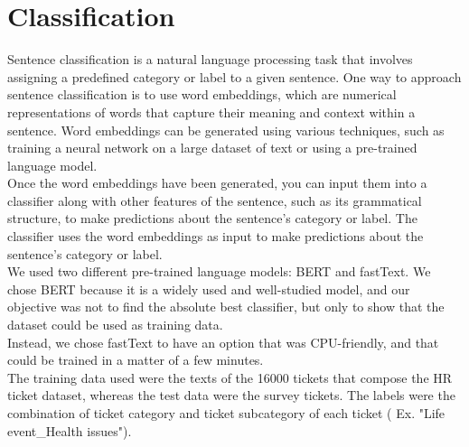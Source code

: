 \clearpage
\section{Classification}
\label{sec:classification}
Sentence classification is a natural language processing task that involves assigning a predefined category or label to a given sentence. One way to approach sentence classification is to use word embeddings, which are numerical representations of words that capture their meaning and context within a sentence. Word embeddings can be generated using various techniques, such as training a neural network on a large dataset of text or using a pre-trained language model. \\
Once the word embeddings have been generated, you can input them into a classifier along with other features of the sentence, such as its grammatical structure, to make predictions about the sentence's category or label. The classifier uses the word embeddings as input to make predictions about the sentence's category or label. \\
We used two different pre-trained language models: BERT and fastText. We chose BERT because it is a widely used and well-studied model, and our objective was not to find the absolute best classifier, but only to show that the dataset could be used as training data. \\
Instead, we chose fastText to have an option that was CPU-friendly, and that could be trained in a matter of a few minutes. \\
The training data used were the texts of the 16000 tickets that compose the HR ticket dataset, whereas the test data were the survey tickets. The labels were the combination of ticket category and ticket subcategory of each ticket ( Ex. "Life event\_Health issues").


